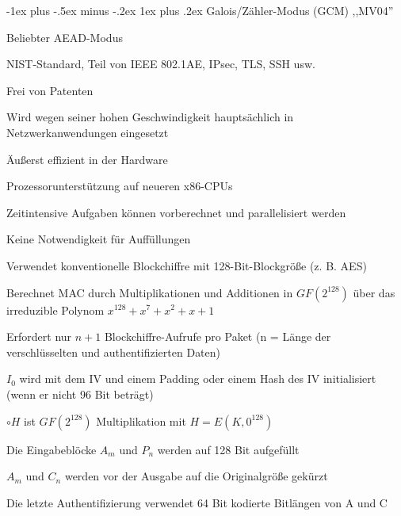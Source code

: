 \documentclass[a4paper]{article}
\makeatletter
\renewcommand{\subsubsection}{\@startsection{subsubsection}{3}{0mm}%
 {-1ex plus -.5ex minus -.2ex}%
 {1ex plus .2ex}%
 {\normalfont\small\bfseries}}
\makeatother
\begin{document}
\begin{multicols}{3}
      \subsubsection{Galois/Zähler-Modus (GCM) ,,MV04''}
      \begin{itemize*}
            \item Beliebter AEAD-Modus
            \item NIST-Standard, Teil von IEEE 802.1AE, IPsec, TLS, SSH usw.
            \item Frei von Patenten
            \item Wird wegen seiner hohen Geschwindigkeit hauptsächlich in Netzwerkanwendungen eingesetzt
            \begin{itemize*}
                  \item Äußerst effizient in der Hardware
                  \item Prozessorunterstützung auf neueren x86-CPUs
                  \item Zeitintensive Aufgaben können vorberechnet und parallelisiert werden
                  \item Keine Notwendigkeit für Auffüllungen
            \end{itemize*}
            \item Verwendet konventionelle Blockchiffre mit 128-Bit-Blockgröße (z. B. AES)
            \item Berechnet MAC durch Multiplikationen und Additionen in $GF(2^{128})$ über das irreduzible Polynom $x^{128}+x^{7}+x^{2}+x+1$
            \item Erfordert nur $n+1$ Blockchiffre-Aufrufe pro Paket (n = Länge der verschlüsselten und authentifizierten Daten)
            \begin{itemize*}
                  \item $I_0$ wird mit dem IV und einem Padding oder einem Hash des IV initialisiert (wenn er nicht 96 Bit beträgt)
                  \item $\circ H$ ist $GF(2^{128})$ Multiplikation mit $H=E(K,0^{128})$
                  \item Die Eingabeblöcke $A_m$ und $P_n$ werden auf 128 Bit aufgefüllt
                  \item $A_m$ und $C_n$ werden vor der Ausgabe auf die Originalgröße gekürzt
                  \item Die letzte Authentifizierung verwendet 64 Bit kodierte Bitlängen von A und C

\end{itemize*}
\end{itemize*}
\end{multicols}
\end{document}
